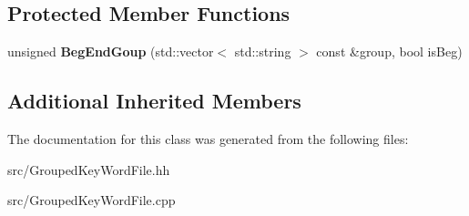 \subsection*{Protected Member Functions}
\begin{DoxyCompactItemize}
\item 
\hypertarget{classstb_1_1GroupedKeyWordFile_a2674710aa2b4c3d24483ab844968437c}{unsigned {\bfseries Beg\+End\+Goup} (std\+::vector$<$ std\+::string $>$ const \&group, bool is\+Beg)}\label{classstb_1_1GroupedKeyWordFile_a2674710aa2b4c3d24483ab844968437c}

\end{DoxyCompactItemize}
\subsection*{Additional Inherited Members}


The documentation for this class was generated from the following files\+:\begin{DoxyCompactItemize}
\item 
src/Grouped\+Key\+Word\+File.\+hh\item 
src/Grouped\+Key\+Word\+File.\+cpp\end{DoxyCompactItemize}
